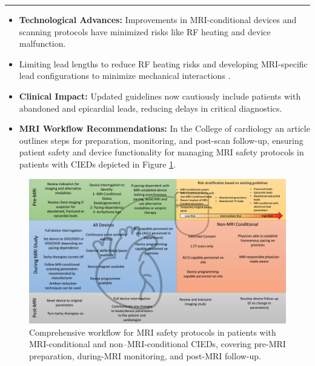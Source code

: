\documentclass[final]{article}
\newcommand{\posterSection}[1]{
    \noindent{
        \color{DarkBlue}
        \fontsize{50}{60}\bfseries #1
    }
    \vspace{0.5em}
    \hrule
    \vspace{1em}
}
\begin{document}
\begin{multicols}{3}

\posterSection{Safety Strategies}
\begin{itemize}
    \item \textbf{Technological Advances:} Improvements in MRI-conditional devices and scanning protocols have minimized risks like RF heating and device malfunction.
    \item Limiting lead lengths to reduce RF heating risks \cite{aboyewa2021} and developing MRI-specific lead configurations to minimize mechanical interactions \cite{haddix2022}.
    \item \textbf{Clinical Impact:} Updated guidelines now cautiously include patients with abandoned and epicardial leads, reducing delays in critical diagnostics.
    \item \textbf{MRI Workflow Recommendations:} In the College of cardiology an article outlines steps for preparation, monitoring, and post-scan follow-up, ensuring patient safety and device functionality for managing MRI safety protocols in patients with CIEDs depicted in Figure \ref{fig:safety_protocols}.
\end{itemize}


\begin{figure}[H]
    \centering
    \includegraphics[width=0.8\linewidth]{IMAG-EA-Zghaib_Fig1.png}
    \caption{Comprehensive workflow for MRI safety protocols in patients with MRI-conditional and non–MRI-conditional CIEDs, covering pre-MRI preparation, during-MRI monitoring, and post-MRI follow-up.\cite{zghaib2024mri} }
    \label{fig:safety_protocols}
\end{figure}


\end{multicols}
\end{document}
